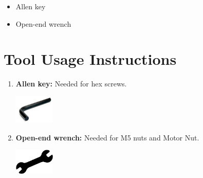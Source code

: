 \begin{itemize}[label=\textbullet]
    \item Allen key
    \item Open-end wrench
\end{itemize}

\section*{Tool Usage Instructions}

\begin{enumerate}
    \item \textbf{Allen key:} Needed for hex screws.
    \begin{center}
        \includegraphics[width=0.15\textwidth]{../images/tool2.png}
    \end{center}
    \item \textbf{Open-end wrench:} Needed for M5 nuts and Motor Nut.
    \begin{center}
        \includegraphics[width=0.15\textwidth]{../images/tool1.png}
    \end{center}
\end{enumerate}
